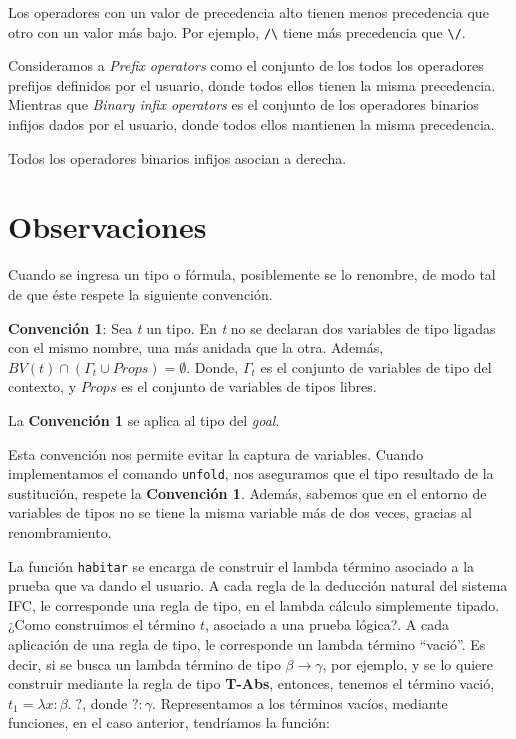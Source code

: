 \documentclass[a4paper,11pt]{article}
\theoremstyle{definition}
\begin{document}
Los operadores con un valor de precedencia alto tienen menos precedencia que otro con un valor más bajo.
Por ejemplo, \texttt{/\textbackslash} tiene más precedencia que \texttt{\textbackslash/}.

Consideramos a \textit{Prefix operators} como el conjunto de los todos los operadores prefijos definidos por el usuario,
donde todos ellos tienen la misma precedencia.
Mientras que \textit{Binary infix operators} es el conjunto de los operadores binarios infijos dados por el usuario,
donde todos ellos mantienen la misma precedencia.

Todos los operadores binarios infijos asocian a derecha.


\section{Observaciones}
Cuando se ingresa un tipo o fórmula, posiblemente se lo renombre, de modo tal de que éste respete la siguiente
convención.
  
\textbf{Convención 1}: Sea \textit{t} un tipo. 
En \textit{t} no se declaran dos variables de tipo ligadas con el mismo nombre, una más anidada que la otra.
Además, $BV (t) \cap (\Gamma_{t} \cup Props) = \emptyset$. Donde, $\Gamma_{t}$ es el conjunto de variables de tipo del contexto, y $Props$ es el conjunto
de variables de tipos libres.

La \textbf{Convención 1} se aplica al tipo del \textit{goal}.

Esta convención nos permite evitar la captura de variables. 
Cuando implementamos el comando \texttt{unfold}, nos aseguramos que el tipo resultado de la sustitución, respete la \textbf{Convención 1}.
Además, sabemos que en el entorno de variables de tipos no se tiene la misma variable más de dos veces, gracias al renombramiento.

La función \texttt{habitar} se encarga de construir el lambda término asociado a la prueba que va dando el usuario.
A cada regla de la deducción natural del sistema IFC, le corresponde una regla de tipo, en el lambda cálculo simplemente
tipado. ¿Como construimos el término $t$, asociado a una prueba lógica?.
A cada aplicación de una regla de tipo, le corresponde un lambda término ``vació''.
Es decir, si se busca un lambda término de tipo $\beta \rightarrow \gamma$, por ejemplo, y se lo quiere construir mediante la regla 
de tipo \textbf{T-Abs}, entonces, tenemos el término vació, $t_{1} = \lambda x:\beta. \; ?$, donde $? : \gamma$.
Representamos a los términos vacíos, mediante funciones, en el caso anterior, tendríamos la función:
\end{document}
